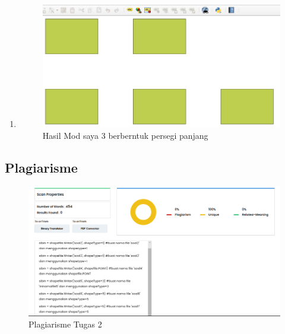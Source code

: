 \begin{enumerate}
    \item 
	
	\begin{figure}[H]
		\includegraphics[width=12cm]{figures/1174059/Python1/soal10.PNG}
		\centering
		\caption{Hasil Mod saya 3 berberntuk persegi panjang}
	\end{figure}
\end{enumerate}

\subsection {Plagiarisme}
\begin{figure}[H]
		\includegraphics[width=12cm]{figures/1174059/plagiarisme2.PNG}
		\centering
		\caption{Plagiarisme Tugas 2}
	\end{figure}